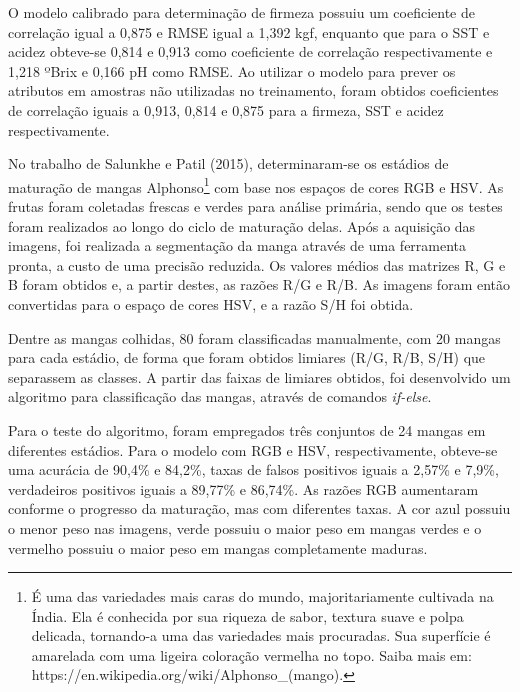 O modelo calibrado para determinação de firmeza possuiu um coeficiente de correlação igual a 0,875 e RMSE igual a 1,392 kgf, enquanto que para o SST e acidez obteve-se 0,814 e 0,913 como coeficiente de correlação respectivamente e 1,218 ºBrix e 0,166 pH como RMSE. Ao utilizar o modelo para prever os atributos em amostras não utilizadas no treinamento, foram obtidos coeficientes de correlação iguais 	a 0,913, 0,814 e 0,875 para a firmeza, SST e acidez respectivamente. 

No trabalho de Salunkhe e Patil (2015), determinaram-se os estádios de maturação de mangas Alphonso\footnote{\label{ftnote:alphonso}É uma das variedades mais caras do mundo, majoritariamente cultivada na Índia. Ela é conhecida por sua riqueza de sabor, textura suave e polpa delicada, tornando-a uma das variedades mais procuradas. Sua superfície é amarelada com uma ligeira coloração vermelha no topo. Saiba mais em: https://en.wikipedia.org/wiki/Alphonso\_(mango).} com base nos espaços de cores RGB e HSV. As frutas foram coletadas frescas e verdes para análise primária, sendo que os testes foram realizados ao longo do ciclo de maturação delas. Após a aquisição das imagens, foi realizada a segmentação da manga através de uma ferramenta pronta, a custo de uma precisão reduzida. Os valores médios das matrizes R, G e B foram obtidos e, a partir destes, as razões R/G e R/B. As imagens foram então convertidas para o espaço de cores HSV, e a razão S/H foi obtida.

Dentre as mangas colhidas, 80 foram classificadas manualmente, com 20 mangas para cada estádio, de forma que foram obtidos limiares (R/G, R/B, S/H) que separassem as classes. A partir das faixas de limiares obtidos, foi desenvolvido um algoritmo para classificação das mangas, através de comandos \textit{if-else}.

Para o teste do algoritmo, foram empregados três conjuntos de 24 mangas em diferentes estádios. Para o modelo com RGB e HSV, respectivamente, obteve-se uma acurácia de 90,4\% e 84,2\%, taxas de falsos positivos iguais a 2,57\% e 7,9\%, verdadeiros positivos iguais a 89,77\% e 86,74\%. As razões RGB aumentaram conforme o progresso da maturação, mas com diferentes taxas. A cor azul possuiu o menor peso nas imagens, verde possuiu o maior peso em mangas verdes e o vermelho possuiu o maior peso em mangas completamente maduras.

